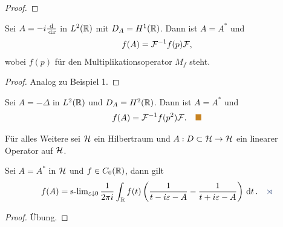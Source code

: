 \begin{bsp*}
\begin{bspenum}
\begin{proof}
\end{proof}
\item Sei $A = -i\frac{\mathrm{d}}{\,\mathrm{d} x}$ in $L^2(\mathbb{R})$ mit $D_A=H^1(\mathbb{R})$. Dann ist
$A=A^*$ und
\begin{align*}
f(A) = \mathcal{F}^{-1}f(p)\mathcal{F},
\end{align*}
wobei $f(p)$ für den Multiplikationsoperator $M_f$ steht.
\begin{proof}
Analog zu Beispiel 1.\qedhere
\end{proof}
\item Sei $A=-\Delta$ in $L^2(\mathbb{R})$ und $D_A=H^2(\mathbb{R})$. Dann ist $A=A^*$ und
\begin{align*}
f(A) = \FF^{-1}f(p^2)\FF.\bsphere
\end{align*}
\end{bspenum}
\end{bsp*}

Für alles Weitere sei $\mathcal{H}$ ein Hilbertraum und $A: D\subset \mathcal{H}\to \mathcal{H}$ ein
linearer Operator auf $\mathcal{H}$.

\begin{prop}
\label{prop:6.3}
Sei $A=A^*$ in $\mathcal{H}$ und $f\in C_0(\mathbb{R})$, dann gilt
\begin{align*}
f(A) = \slim\limits_{\ep\downarrow 0}
\frac{1}{2\pi i}
\int_\R f(t) \left(\frac{1}{t-i\ep -A} - \frac{1}{t+i\ep-A}\right)\dt.\fishhere
\end{align*}
\end{prop}
\begin{proof}
Übung.\qedhere
\end{proof}

